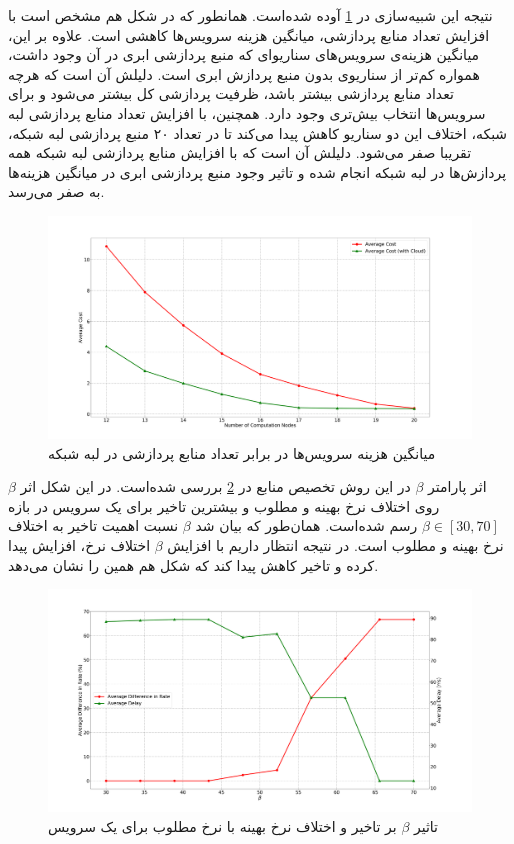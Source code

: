     نتیجه این شبیه‌سازی در \cref{fig:many_to_many:sim6} آوده شده‌است.
    همانطور که در شکل هم مشخص است با افزایش تعداد منابع پردازشی، میانگین هزینه سرویس‌ها کاهشی است.
    علاوه بر این، میانگین هزینه‌ی سرویس‌های سناریوای که منبع پردازشی ابری در آن وجود داشت، همواره کم‌تر از سناریوی بدون منبع پردازش ابری است.
    دلیلش آن است که هرچه تعداد منابع پردازشی بیشتر باشد، ظرفیت پردازشی کل بیشتر می‌شود و برای سرویس‌ها انتخاب بیش‌تری وجود دارد.
    همچنین، با افزایش تعداد منابع پردازشی لبه شبکه، اختلاف این دو سناریو کاهش پیدا می‌کند تا در تعداد ۲۰ منبع پردازشی لبه شبکه، تقریبا صفر می‌شود.
    دلیلش آن است که با افزایش منابع پردازشی لبه شبکه همه پردازش‌ها در لبه شبکه انجام شده و تاثیر وجود منبع پردازشی ابری در میانگین هزینه‌ها به صفر می‌رسد.

    \begin{figure}[]
      \centerline{\includegraphics[width=17cm]{graphics/many_to_many/sim_6}}
      \caption{میانگین هزینه سرویس‌ها در برابر تعداد منابع پردازشی در لبه شبکه}
      \label{fig:many_to_many:sim6}
    \end{figure}

    اثر پارامتر $\beta$ در این روش تخصیص منابع در \cref{fig:many_to_many:sim7} بررسی شده‌است.
    در این شکل اثر $\beta$ روی اختلاف نرخ بهینه و مطلوب و بیشترین تاخیر برای یک سرویس در بازه $\beta\in[30, 70]$ رسم شده‌است.
    همان‌طور که بیان شد $\beta$ نسبت اهمیت تاخیر به اختلاف نرخ بهینه و مطلوب است.
    در نتیجه انتظار داریم با افزایش $\beta$ اختلاف نرخ، افزایش پیدا کرده و تاخیر کاهش پیدا کند که شکل هم همین را نشان می‌دهد.
    
    \begin{figure}[]
      \centerline{\includegraphics[width=17cm]{graphics/many_to_many/sim_7}}
      \caption{تاثیر $\beta$ بر تاخیر و اختلاف نرخ بهینه با نرخ مطلوب برای یک سرویس}
      \label{fig:many_to_many:sim7}
    \end{figure}

